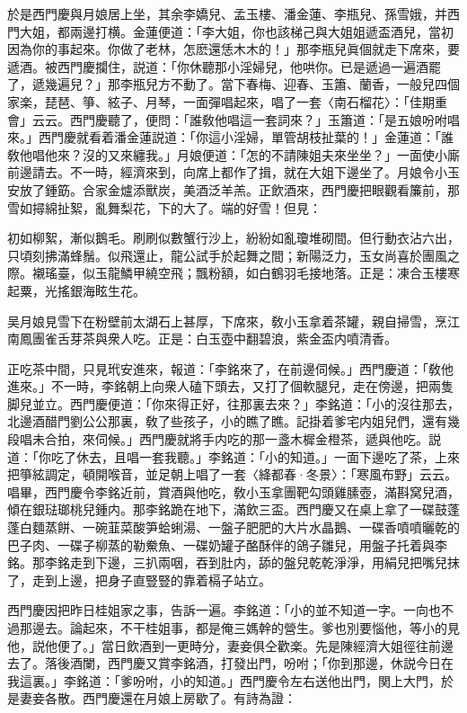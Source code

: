 於是西門慶與月娘居上坐，其余李嬌兒、孟玉樓、潘金蓮、李瓶兒、孫雪娥，并西門大姐，都兩邊打横。金蓮便道：「李大姐，你也該梯己與大姐姐遞盃酒兒，當初因為你的事起來。你做了老林，怎麽還恁木木的！」那李瓶兒眞個就走下席來，要遞酒。被西門慶攔住，説道：「你休聽那小淫婦兒，他哄你。已是遞過一遍酒罷了，遞幾遍兒？」那李瓶兒方不動了。當下春梅、迎春、玉簫、蘭香，一般兒四個家楽，琵琶、箏、絃子、月琴，一面彈唱起來，唱了一套〈南石榴花〉：「佳期重會」云云。西門慶聽了，便問：「誰敎他唱這一套詞來？」玉簫道：「是五娘吩咐唱來。」西門慶就看着潘金蓮説道：「你這小淫婦，單管胡枝扯葉的！」金蓮道：「誰敎他唱他來？沒的又來纏我。」月娘便道：「怎的不請陳姐夫來坐坐？」一面使小廝前邊請去。不一時，經濟來到，向席上都作了揖，就在大姐下邊坐了。月娘令小玉安放了鍾筯。合家金爐添獸炭，美酒泛羊羔。正飲酒來，西門慶把眼觀看簾前，那雪如撏綿扯絮，亂舞梨花，下的大了。端的好雪！但見：

初如柳絮，漸似鵝毛。刷刷似數蟹行沙上，紛紛如亂瓊堆砌間。但行動衣沾六出，只頃刻拂滿蜂鬚。似飛還止，龍公試手於起舞之間；新陽泛力，玉女尚喜於團風之際。襯瑤臺，似玉龍鱗甲繞空飛；飄粉額，如白鶴羽毛接地落。正是：凍合玉樓寒起粟，光搖銀海眩生花。

吴月娘見雪下在粉壁前太湖石上甚厚，下席來，敎小玉拿着茶罐，親自掃雪，烹江南鳳團雀舌芽茶與衆人吃。正是：白玉壺中翻碧浪，紫金盃内噴清香。

正吃茶中間，只見玳安進來，報道：「李銘來了，在前邊伺候。」西門慶道：「敎他進來。」不一時，李銘朝上向衆人磕下頭去，又打了個軟腿兒，走在傍邊，把兩隻脚兒並立。西門慶便道：「你來得正好，往那裏去來？」李銘道：「小的沒往那去，北邊酒醋門劉公公那裏，敎了些孩子，小的瞧了瞧。記掛着爹宅内姐兒們，還有幾段唱未合拍，來伺候。」西門慶就將手内吃的那一盞木樨金橙茶，遞與他吃。説道：「你吃了休去，且唱一套我聽。」李銘道：「小的知道。」一面下邊吃了茶，上來把箏絃調定，頓開喉音，並足朝上唱了一套〈絳都春·冬景〉：「寒風布野」云云。　唱畢，西門慶令李銘近前，賞酒與他吃，敎小玉拿團靶勾頭雞膆壺，滿斟窝兒酒，傾在銀琺瑯桃兒鍾内。那李銘跪在地下，滿飲三盃。西門慶又在桌上拿了一碟鼓蓬蓬白麵蒸餅、一碗韮菜酸笋蛤蜊湯、一盤子肥肥的大片水晶鵝、一碟香噴噴曬乾的巴子肉、一碟子柳蒸的勒鮝魚、一碟奶罐子酪酥伴的鴿子雛兒，用盤子托着與李銘。那李銘走到下邊，三扒兩咽，吞到肚内，舔的盤兒乾乾淨淨，用絹兒把嘴兒抹了，走到上邊，把身子直豎豎的靠着槅子站立。

西門慶因把昨日桂姐家之事，告訴一遍。李銘道：「小的並不知道一字。一向也不過那邊去。論起來，不干桂姐事，都是俺三媽幹的營生。爹也別要惱他，等小的見他，説他便了。」當日飲酒到一更時分，妻妾俱仝歡楽。先是陳經濟大姐徑往前邊去了。落後酒闌，西門慶又賞李銘酒，打發出門，吩咐；「你到那邊，休説今日在我這裏。」李銘道：「爹吩咐，小的知道。」西門慶令左右送他出門，関上大門，於是妻妾各散。西門慶還在月娘上房歇了。有詩為證：

